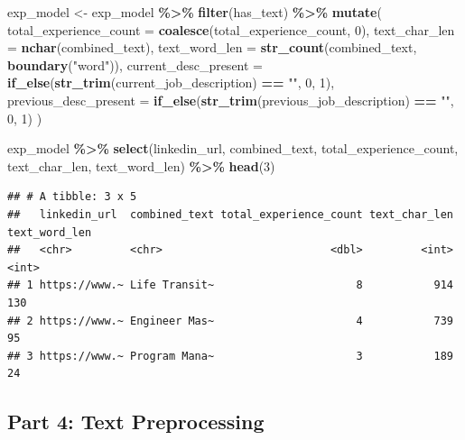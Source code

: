 \documentclass[
]{article}
\newenvironment{Shaded}{\begin{snugshade}}{\end{snugshade}}
\newcommand{\AttributeTok}[1]{\textcolor[rgb]{0.13,0.29,0.53}{#1}}
\newcommand{\DecValTok}[1]{\textcolor[rgb]{0.00,0.00,0.81}{#1}}
\newcommand{\FunctionTok}[1]{\textcolor[rgb]{0.13,0.29,0.53}{\textbf{#1}}}
\newcommand{\NormalTok}[1]{#1}
\newcommand{\OtherTok}[1]{\textcolor[rgb]{0.56,0.35,0.01}{#1}}
\newcommand{\SpecialCharTok}[1]{\textcolor[rgb]{0.81,0.36,0.00}{\textbf{#1}}}
\newcommand{\StringTok}[1]{\textcolor[rgb]{0.31,0.60,0.02}{#1}}
\begin{document}
\begin{Shaded}
\begin{Highlighting}[]
\NormalTok{exp\_model }\OtherTok{\textless{}{-}}\NormalTok{ exp\_model }\SpecialCharTok{\%\textgreater{}\%}
  \FunctionTok{filter}\NormalTok{(has\_text) }\SpecialCharTok{\%\textgreater{}\%}
  \FunctionTok{mutate}\NormalTok{(}
    \AttributeTok{total\_experience\_count =} \FunctionTok{coalesce}\NormalTok{(total\_experience\_count, }\DecValTok{0}\NormalTok{),}
    \AttributeTok{text\_char\_len =} \FunctionTok{nchar}\NormalTok{(combined\_text),}
    \AttributeTok{text\_word\_len =} \FunctionTok{str\_count}\NormalTok{(combined\_text, }\FunctionTok{boundary}\NormalTok{(}\StringTok{"word"}\NormalTok{)),}
    \AttributeTok{current\_desc\_present =} \FunctionTok{if\_else}\NormalTok{(}\FunctionTok{str\_trim}\NormalTok{(current\_job\_description) }\SpecialCharTok{==} \StringTok{""}\NormalTok{, }\DecValTok{0}\NormalTok{, }\DecValTok{1}\NormalTok{),}
    \AttributeTok{previous\_desc\_present =} \FunctionTok{if\_else}\NormalTok{(}\FunctionTok{str\_trim}\NormalTok{(previous\_job\_description) }\SpecialCharTok{==} \StringTok{""}\NormalTok{, }\DecValTok{0}\NormalTok{, }\DecValTok{1}\NormalTok{)}
\NormalTok{  )}

\NormalTok{exp\_model }\SpecialCharTok{\%\textgreater{}\%}
  \FunctionTok{select}\NormalTok{(linkedin\_url, combined\_text, total\_experience\_count, text\_char\_len, text\_word\_len) }\SpecialCharTok{\%\textgreater{}\%}
  \FunctionTok{head}\NormalTok{(}\DecValTok{3}\NormalTok{)}
\end{Highlighting}
\end{Shaded}

\begin{verbatim}
## # A tibble: 3 x 5
##   linkedin_url  combined_text total_experience_count text_char_len text_word_len
##   <chr>         <chr>                          <dbl>         <int>         <int>
## 1 https://www.~ Life Transit~                      8           914           130
## 2 https://www.~ Engineer Mas~                      4           739            95
## 3 https://www.~ Program Mana~                      3           189            24
\end{verbatim}

\subsection{Part 4: Text Preprocessing}\label{part-4-text-preprocessing}
\end{document}
